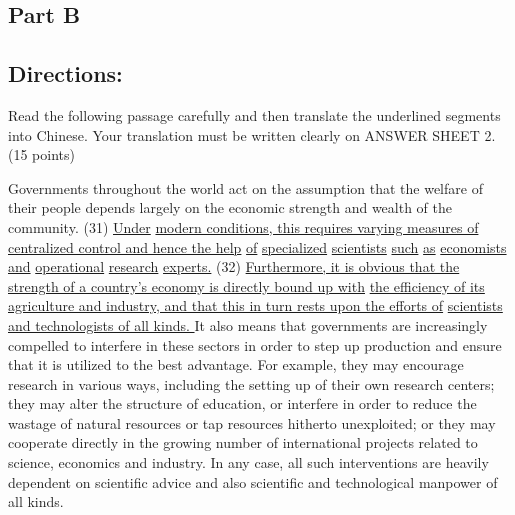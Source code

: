 \documentclass[UTF8,11pt]{ctexart}
\begin{document}
\subsection*{\textbf{Part B}}


\subsection*{\textbf{Directions:}}


Read the following passage carefully and then translate the underlined segments into Chinese. Your translation must be written clearly on ANSWER SHEET 2. (15 points)


Governments throughout the world act on the assumption that the welfare of their people depends largely on the economic strength and wealth of the community. (31) \uline{Under} \uline{modern conditions, this requires varying measures of centralized control and hence the help} \uline{of} \uline{specialized} \uline{scientists} \uline{such} \uline{as} \uline{economists} \uline{and} \uline{operational} \uline{research} \uline{experts.} (32) \uline{Furthermore, it is obvious that the strength of a country’s economy is directly bound up with} \uline{the efficiency of its agriculture and industry, and that this in turn rests upon the efforts of} \uline{scientists and technologists of all kinds. }It also means that governments are increasingly compelled to interfere in these sectors in order to step up production and ensure that it is utilized to the best advantage. For example, they may encourage research in various ways, including the setting up of their own research centers; they may alter the structure of education, or interfere in order to reduce the wastage of natural resources or tap resources hitherto unexploited; or they may cooperate directly in the growing number of international projects related to science, economics and industry. In any case, all such interventions are heavily dependent on scientific advice and also scientific and technological manpower of all kinds.
\end{document}
